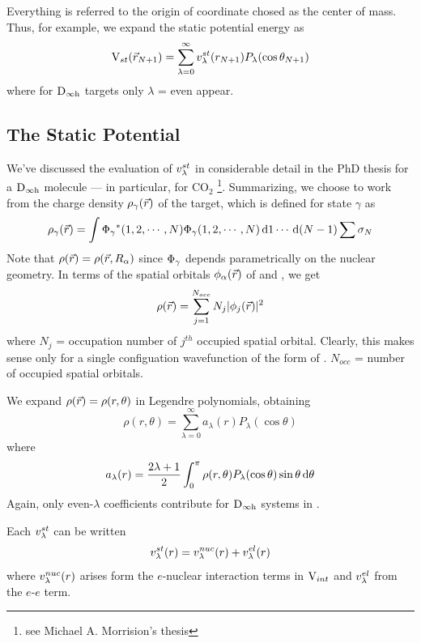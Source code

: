 \documentclass[aps,pra,groupedaddress,12pt,
               amsfonts,amssymb,
               preprint
    ]{revtex4}
\begin{document}
Everything is referred to the origin of coordinate chosed as the center
of mass. Thus, for example, we expand the static potential energy
 as
\begin{equation}
  \label{eq:vstels}
\mathrm{V}_{st}(\vec{r}_{N+1})=\sum_{\lambda=0}^\infty v_\lambda^{st}(r_{N+1})P_\lambda(\cos\theta_{N+1})  
\end{equation}
where for $\mathrm{D}_{\infty\text{h}}$ targets only $\lambda$ = even appear.

\subsection{The Static Potential}
\label{sec:static-potential}
We've discussed the evaluation of $v_\lambda^{st}$ in considerable detail in the
PhD thesis for a $\mathrm{D}_{\infty\text{h}}$ molecule --- in particular, for CO$_2$
\footnote{see Michael A. Morrision's thesis}. Summarizing, we choose to
work from the charge density $\rho_\gamma(\vec{r})$ of the target, which is
defined for state $\gamma$ as
\begin{equation}
  \label{eq:den}
  \rho_\gamma(\vec{r}) = \int\Phi_\gamma{}^*(1,2,\cdots,N)\Phi_\gamma(1,2,\cdots,N)\,\mathrm{d} 1\cdots\,\mathrm{d} (N-1)\sum\sigma_N
\end{equation}
Note that $\rho(\vec{r}) = \rho(\vec{r},R_\alpha)$ since $\Phi_\gamma$ depends
parametrically on the nuclear geometry. In terms of the spatial orbitals
$\phi_\alpha(\vec{r})$ of  and , we get
\begin{equation}
  \label{eq:dena}
\rho(\vec{r}) = \sum_{j=1}^{N_{occ}}N_j|\phi_j(\vec{r})|^2
\end{equation}
where $N_j$ = occupation number of $j^{th}$ occupied spatial orbital.
Clearly, this makes sense only for a single configuation wavefunction of
the form of . $N_{occ}$ = number of occupied spatial orbitals.

We expand $\rho(\vec{r}) = \rho(r,\theta)$ in Legendre polynomials,
obtaining
\begin{equation}
  \label{eq:denl}
  \rho(r,\theta) = \sum_{\lambda=0}^{\infty}a_\lambda(r)P_\lambda(\cos\theta)
\end{equation}
where
\begin{equation}
  \label{eq:alam}
  a_\lambda(r) = \dfrac{2\lambda+1}{2}
                 \int_0^\pi\rho(r,\theta)P_\lambda(\cos\theta)\sin\theta\,\mathrm{d}\theta
\end{equation}
Again, only even-$\lambda$ coefficients contribute for $\mathrm{D}_{\infty\text{h}}$ systems in
.

Each $v_\lambda^{st}$ can be written
\begin{equation}
  \label{eq:vsts}
  v_\lambda^{st}(r) = v_\lambda^{nuc}(r) + v_\lambda^{el}(r)
\end{equation}
where $v_\lambda^{nuc}(r)$ arises form the $e$-nuclear interaction terms in $\mathrm{V}_{int}$
and $v_\lambda^{el}$ from the $e$-$e$ term.
\end{document}
